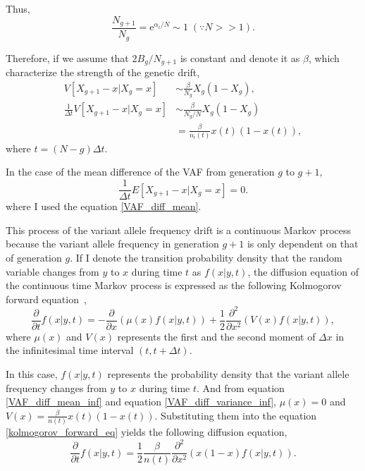 \documentclass[12pt]{article}
\newcommand{\napier}{\mathrm{e}}
\newcommand{\henbibun}[2]{\frac{\partial {#1}}{\partial {#2}}}
\newcommand{\equationref}[1]{equation \eqref{#1}}
\begin{document}
Thus,
\begin{equation}
 \frac{N_{g+1}}{N_g} = \napier^{\alpha_i / N} \sim 1 \; \left(\because N >> 1\right).
\end{equation}

Therefore, if we assume that $2B_g/N_{g+1}$ is constant and denote it as $\beta$, which characterize the strength of the genetic drift,
\begin{align}
 V[X_{g+1} - x | X_g=x] & \sim \frac{\beta}{N_g} X_g \left(1 - X_g \right),\nonumber\\
 \frac{1}{\varDelta t}V[X_{g+1} - x | X_{g}=x] & \sim \frac{\beta}{N_g/N} X_g \left(1 - X_g \right)\nonumber \\
 & = \frac{\beta}{n_i(t)} x(t) \left(1 - x(t) \right),\label{VAF_diff_variance_inf}
\end{align}
where $t = (N - g) \varDelta t$.

In the case of the mean difference of the VAF from generation $g$ to $g+1$, 
\begin{equation}
 \frac{1}{\varDelta t} E[X_{g+1} - x | X_{g}=x] = 0.\label{VAF_diff_mean_inf}
\end{equation}
where I used the \equationref{VAF_diff_mean}.

This process of the variant allele frequency drift is a continuous Markov process because the variant allele frequency in generation $g+1$ is only dependent on that of generation $g$.
If I denote the transition probability density that the random variable changes from $y$ to $x$ during time $t$ as $f(x|y,t)$, the diffusion equation of the continuous time Markov process is expressed as the following Kolmogorov forward equation~\cite{kolmogoroff1931analytischen},
\begin{equation}
 \henbibun{}{t} f(x|y,t) = - \henbibun{}{x} \left( \mu(x) f(x|y,t) \right) + \frac{1}{2} \frac{\partial^2}{\partial x^2} \left( V(x) f(x|y,t) \right),\label{kolmogorov_forward_eq}
\end{equation}
where $\mu(x)$ and $V(x)$ represents the first and the second moment of $\varDelta x$ in the infinitesimal time interval $(t,t + \varDelta t)$.

In this case, $f(x|y,t)$ represents the probability density that the variant allele frequency changes from $y$ to $x$ during time $t$.
And from \equationref{VAF_diff_mean_inf} and \equationref{VAF_diff_variance_inf}, $\mu(x) = 0$ and $V(x) = \frac{\beta}{n(t)} x(t) \left(1 - x(t) \right)$.
Substituting them into the \equationref{kolmogorov_forward_eq} yields the following diffusion equation,
\begin{equation}
 \henbibun{}{t} f(x|y,t) = \frac{1}{2} \frac{\beta}{n(t)} \frac{\partial^2}{\partial x^2} \left( x(1-x) f(x|y,t) \right).\label{WF_dissusion}
\end{equation}
\end{document}
